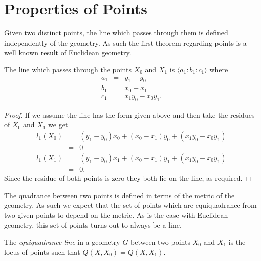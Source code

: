 \section{Properties of Points}

Given two distinct points, the line which passes through them is defined independently of the geometry.
As such the first theorem regarding points is a well known result of Euclidean geometry.
\begin{theorem} The line which passes through the points $X_0$ and $X_1$ is $\langle a_1\!:\!b_1\!:\!c_1\rangle$ where
\begin{eqnarray}
a_1 & = & y_1 - y_0\\
b_1 & = & x_0 - x_1\\
c_1 & = & x_1y_0 - x_0y_1.
\end{eqnarray}
\end{theorem}
\begin{proof}If we assume the line has the form given above and then take the residues of $X_0$ and $X_1$ we get
\begin{eqnarray*}
l_1(X_0) & = & (y_1 - y_0)x_0 + (x_0 - x_1)y_0 + (x_1y_0 - x_0y_1)\\
 & = & 0\\
l_1(X_1) & = & (y_1 - y_0)x_1 + (x_0 - x_1)y_1 + (x_1y_0 - x_0y_1)\\
 & = & 0.
\end{eqnarray*}
Since the residue of both points is zero they both lie on the line, as required.
\end{proof}

The quadrance between two points is defined in terms of the metric of the geometry.
As such we expect that the set of points which are equiquadrance from two given points to depend on the metric.
As is the case with Euclidean geometry, this set of points turns out to always be a line.

\begin{definition} The \emph{equiquadrance line} in a geometry $G$ between two points $X_0$ and $X_1$ is the locus of points such that $Q(X, X_0) = Q(X, X_1)$.
\end{definition}

